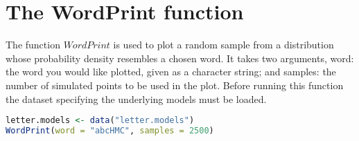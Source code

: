 \documentclass[10pt,a4paper,portrait]{article}
\begin{document}
\section{The WordPrint function}
The function $WordPrint$ is used to plot a random sample from a distribution
whose probability density resembles a chosen word. It takes two arguments,
word: the word you would like plotted, given as a character string; and samples:
the number of simulated points to be used in the plot. Before running this function the dataset specifying the underlying models must be loaded.

\begin{lstlisting}[backgroundcolor = \color{lightgray},
                   language = R,
                   framexleftmargin = 1em]
letter.models <- data("letter.models")
WordPrint(word = "abcHMC", samples = 2500)
\end{lstlisting}
\end{document}
